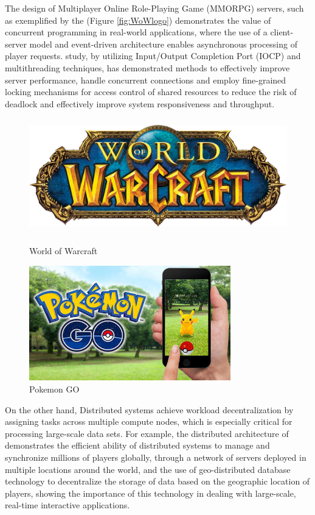 \documentclass{l4proj}
\begin{document}
The design of Multiplayer Online Role-Playing Game (MMORPG) servers, such as exemplified by the \cite{glenday_guinness} (Figure \ref{fig:WoWlogo}) demonstrates the value of concurrent programming in real-world applications, where the use of a client-server model and event-driven architecture enables asynchronous processing of player requests. \cite{kim_2018_design} study, by utilizing Input/Output Completion Port (IOCP) and multithreading techniques, has demonstrated methods to effectively improve server performance, handle concurrent connections and employ fine-grained locking mechanisms for access control of shared resources to reduce the risk of deadlock and effectively improve system responsiveness and throughput.

\begin{figure}[h]
    \centering
    \begin{minipage}[t]{0.35\textwidth}
        \centering
        \includegraphics[width=\linewidth,height=5cm,keepaspectratio]{images/WoWlogo.png}
        \caption{World of Warcraft}
        \label{fig:WoWlogo}
    \end{minipage}
    \quad
    \begin{minipage}[t]{0.30\textwidth}
        \centering
        \includegraphics[width=\linewidth,height=5cm,keepaspectratio]{images/PokemonGo.jpeg}
        \caption{Pokemon GO}
        \label{fig:PokemonGo}
    \end{minipage}
\end{figure}

On the other hand, Distributed systems achieve workload decentralization by assigning tasks across multiple compute nodes, which is especially critical for processing large-scale data sets. For example, the distributed architecture of \cite{wikipediacontributors_2019_pokmon} demonstrates the efficient ability of distributed systems to manage and synchronize millions of players globally, through a network of servers deployed in multiple locations around the world, and the use of geo-distributed database technology to decentralize the storage of data based on the geographic location of players, showing the importance of this technology in dealing with large-scale, real-time interactive applications.
		
\end{document}
